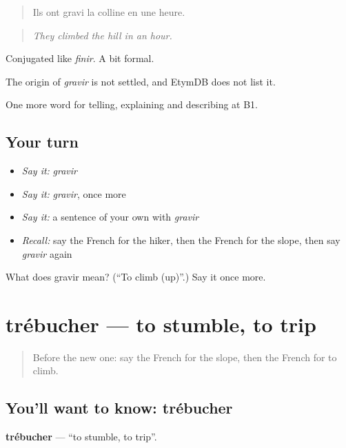 \begin{quote}
Ils ont gravi la colline en une heure.
\end{quote}

\begin{quote}
\emph{They climbed the hill in an hour.}
\end{quote}

Conjugated like \emph{finir}. A bit formal.

\begin{cousinweb}
The origin of \emph{gravir} is not settled, and EtymDB does not list it.
\end{cousinweb}

\begin{grammarlens}[title={What you've built}]
One more word for telling, explaining and describing at B1.
\end{grammarlens}

\subsection*{Your turn}
\begin{itemize}
\raggedright
  \item \emph{Say it:} \emph{gravir}
  \item \emph{Say it:} \emph{gravir}, once more
  \item \emph{Say it:} a sentence of your own with \emph{gravir}
  \item \emph{Recall:} say the French for the hiker, then the French for the slope, then say \emph{gravir} again
\end{itemize}

\begin{tcolorbox}[breakable,colback=teal!4,colframe=teal!35!black,title={Before you move on}]
What does gravir mean? (\textquotedblleft{}To climb (up)\textquotedblright{}.) Say it once more.
\end{tcolorbox}
\section[trébucher]{trébucher — to stumble, to trip}

\label{lesson:FR-C455-trebucher}



\begin{quote}
Before the new one: say the French for the slope, then the French for to climb.
\end{quote}

\subsection*{You'll want to know: trébucher}
\textbf{trébucher} — \textquotedblleft{}to stumble, to trip\textquotedblright{}.

